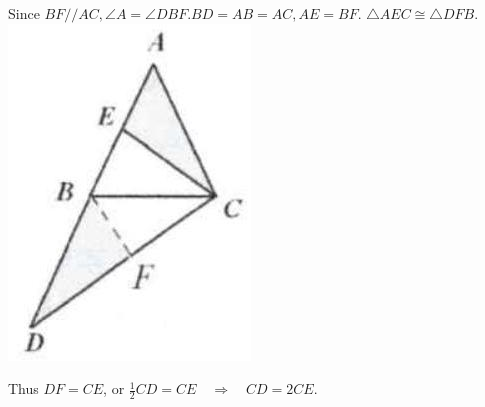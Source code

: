 \documentclass[10pt]{article}
\begin{document}
Since \(B F / / A C, \angle A=\angle D B F . B D=A B=A C, A E=B F\). \(\triangle A E C \cong \triangle D F B\).\\
\includegraphics[max width=\textwidth, center]{2025_04_17_97bc1f7e44d93c271a88g-039(1)}

Thus \(D F=C E\), or \(\frac{1}{2} C D=C E \quad \Rightarrow \quad C D=2 C E\).
\end{document}
